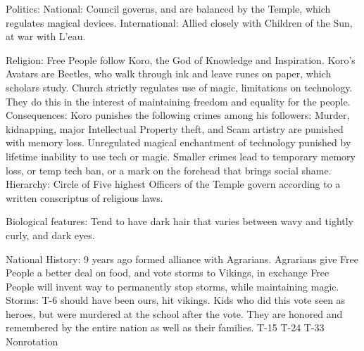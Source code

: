\documentclass[blue]{GL2020}
\begin{document}
Politics:
	National: Council governs, and are balanced by the Temple, which regulates magical devices.
	International:  Allied closely with Children of the Sun, at war with L'eau.
	
Religion:		Free People follow Koro, the God of Knowledge and Inspiration.  Koro's Avatars are Beetles, who walk through ink and leave runes on paper, which scholars study.  Church strictly regulates use of
						magic, limitations on technology.  They do this in the interest of maintaining freedom and 
						equality for the people.  
	Consequences:  Koro punishes the following crimes among his followers:  Murder, kidnapping, major 
						Intellectual Property theft, and Scam artistry are punished with memory loss.  Unregulated 
						magical enchantment of technology punished by lifetime inability to use tech or magic.  
						Smaller crimes lead to temporary memory loss, or temp tech ban, or a mark on the forehead 
						that brings social shame.
	Hierarchy:  Circle of Five highest Officers of the Temple govern according to a written conscriptus of
						religious laws.
	
	
Biological features:	Tend to have dark hair that varies between wavy and tightly curly, and dark eyes.

National History:		9 years ago formed alliance with Agrarians.  Agrarians give Free People a better deal on food, and vote storms to Vikings, in exchange Free People will invent way to permanently stop storms, while maintaining magic.  %
	Storms:		T-6 should have been ours, hit vikings.  Kids who did this vote seen as heroes, but were murdered at the school after the vote.  They are honored and remembered by the entire nation as well as their families. %
						T-15
						T-24
						T-33
						Nonrotation
	
\end{document}
